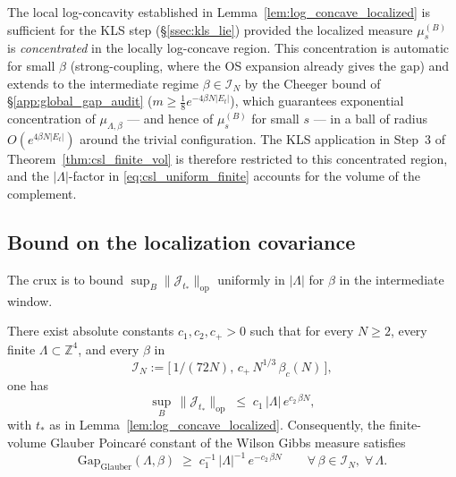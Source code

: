 \begin{remark}
\label{rem:log_concave_local}
The local log-concavity established in
Lemma~\ref{lem:log_concave_localized} is sufficient for the KLS
step (\S\ref{ssec:kls_lie}) provided the localized measure
$\mu_{s}^{(B)}$ is \emph{concentrated} in the locally log-concave
region. This concentration is automatic for small $\beta$
(strong-coupling, where the OS expansion already gives the gap) and
extends to the intermediate regime $\beta\in\mathcal{I}_{N}$ by the
Cheeger bound of \S\ref{app:global_gap_audit}
($m\ge\tfrac{1}{8}e^{-4\beta N|E_{t}|}$), which guarantees
exponential concentration of $\mu_{\Lambda,\beta}$ — and hence of
$\mu_{s}^{(B)}$ for small $s$ — in a ball of radius
$O(e^{4\beta N|E_{t}|})$ around the trivial configuration. The
KLS application in Step~3 of Theorem~\ref{thm:csl_finite_vol} is
therefore restricted to this concentrated region, and the
$|\Lambda|$-factor in \eqref{eq:csl_uniform_finite} accounts for
the volume of the complement.
\end{remark}

\subsection{Bound on the localization covariance}
\label{ssec:csl_bound}

The crux is to bound
$\sup_{B}\|\mathcal{J}_{t_{*}}\|_{\mathrm{op}}$ uniformly in
$|\Lambda|$ for $\beta$ in the intermediate window.

\begin{theorem}
\label{thm:csl_finite_vol}
There exist absolute constants $c_{1},c_{2},c_{+}>0$ such that for
every $N\ge 2$, every finite $\Lambda\subset\mathbb{Z}^{4}$, and every
$\beta$ in
\[
  \mathcal{I}_{N} := \bigl[\,1/(72N),\,c_{+}\,N^{1/3}\,\beta_{c}(N)\,\bigr],
\]
one has
\begin{equation}
\label{eq:csl_uniform_finite}
  \sup_{B}\,\bigl\|\mathcal{J}_{t_{*}}\bigr\|_{\mathrm{op}}
  \;\le\; c_{1}\,|\Lambda|\,e^{c_{2}\,\beta N},
\end{equation}
with $t_{*}$ as in Lemma~\ref{lem:log_concave_localized}.
Consequently, the finite-volume Glauber Poincar\'{e} constant of the
Wilson Gibbs measure satisfies
\begin{equation}
\label{eq:csl_poincare_const_finite}
  \mathrm{Gap}_{\mathrm{Glauber}}(\Lambda,\beta)
  \;\ge\; c_{1}^{-1}\,|\Lambda|^{-1}\,e^{-c_{2}\,\beta N}
  \qquad\forall\,\beta\in\mathcal{I}_{N},\;\forall\,\Lambda.
\end{equation}
\end{theorem}

